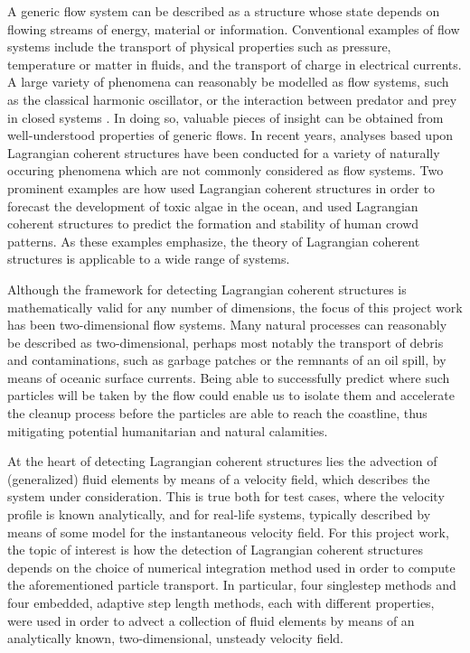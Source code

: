 A generic flow system can be described as a structure whose state depends on
flowing streams of energy, material or information. Conventional examples of
flow systems include the transport of physical properties such as pressure,
temperature or matter in fluids, and the transport of charge in electrical
currents. A large variety of phenomena can reasonably be modelled as flow
systems, such as the classical harmonic oscillator, or the interaction between
predator and prey in closed systems
\parencite[parts I--II]{strogatz2014nonlinear}. In doing so, valuable pieces
of insight can be obtained from well-understood properties of generic flows.
In recent years, analyses based upon Lagrangian coherent structures have been
conducted for a variety of naturally occuring phenomena which are not
commonly considered as flow systems. Two prominent examples are how
\textcite{olascoaga2008tracing} used Lagrangian coherent structures in order
to forecast the development of toxic algae in the ocean, and
\textcite{ali2007lagrangian} used Lagrangian coherent structures to predict
the formation and stability of human crowd patterns. As these examples
emphasize, the theory of Lagrangian coherent structures is applicable to a
wide range of systems.

Although the framework for detecting Lagrangian coherent structures is
mathematically valid for any number of dimensions, the focus of this project
work has been two-dimensional flow systems. Many natural processes can
reasonably be described as two-dimensional, perhaps most notably the transport
of debris and contaminations, such as garbage patches or the remnants of
an oil spill, by means of oceanic surface currents. Being able to successfully
predict where such particles will be taken by the flow could enable us to
isolate them and accelerate the cleanup process before the particles are able
to reach the coastline, thus mitigating potential humanitarian and natural
calamities.

%
At the heart of detecting Lagrangian coherent structures lies the advection
of (generalized) fluid elements by means of a velocity field, which describes
the system under consideration. This is true both for test cases, where the
velocity profile is known analytically, and for real-life systems, typically
described by means of some model for the instantaneous velocity field. For this
project work, the topic of interest is how the detection of Lagrangian coherent
structures depends on the choice of numerical integration method used in order
to compute the aforementioned particle transport. In particular, four singlestep
methods and four embedded, adaptive step length methods, each with different
properties, were used in order to advect a collection of fluid elements by means
of an analytically known, two-dimensional, unsteady velocity field.


